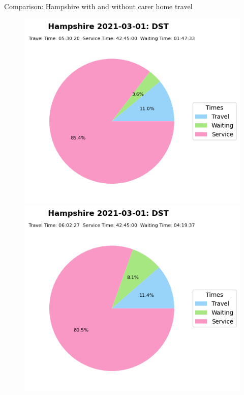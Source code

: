 \documentclass[usenames,dvipsnames]{beamer}
\begin{document}
\begin{frame}{Comparison: Hampshire with and without carer home travel}
	\begin{figure}
		\includegraphics[width=0.5\linewidth]{figures/og_inst_Hampshire_2021-03-01_time_info_dst}%
		\includegraphics[width=0.5\linewidth]{figures/nurse_inst_Hampshire_2021-03-01_time_info_dst}
	\end{figure}
\end{frame}
\end{document}
